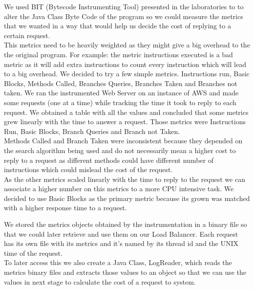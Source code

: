 \documentclass[times, 10pt,twocolumn]{article}
\begin{document}
   We used BIT (Bytecode Instrumenting Tool) presented in the laboratories to 
   to alter the Java Class Byte Code of the program so we could measure the metrics
   that we wanted in a way that would help us decide the cost of replying to a certain request.\\
   This metrics need to be heavily weighted as they might give a big overhead to the 
   the original program. For example: the metric instructions executed is a bad metric
   as it will add extra instructions to count every instruction which will lead to a 
   big overhead.
   We decided to try a few simple metrics. Instructions run, Basic Blocks, 
   Methods Called, Branches Queries, Branches Taken and Branches not taken. 
   We ran the instrumented Web Server on an instance of AWS and made some requests 
   (one at a time) while tracking the time it took to reply to each request.
   We obtained a table with all the values and concluded that some metrics grew
   linearly with the time to answer a request. Those metrics were Instructions
   Run, Basic Blocks, Branch Queries and Branch not Taken.\\
   Methods Called and Branch Taken were inconsistent because they depended on 
   the search algorithm being used and do not necessarily mean a higher cost to 
   reply to a request as different methods could have different number of instructions
   which could mislead the cost of the request.\\
   As the other metrics scaled linearly with the time to reply to the request we can
   associate a higher number on this metrics to a more CPU intensive task.
   We decided to use Basic Blocks as the primary metric because its grown 
   was matched with a higher response time to a request. 

   We stored the metrics objects obtained by the instrumentation in a binary
   file so that we could later retrieve and use them on our Load Balancer. Each 
   request has its own file with its metrics and it's named by its thread id 
   and the UNIX time of the request.\\
   To later access this we also create a Java Class, LogReader, which reads
   the metrics binary files and extracts those values to an object so that 
   we can use the values in next stage to calculate the cost of a request to
   system.
\end{document}
